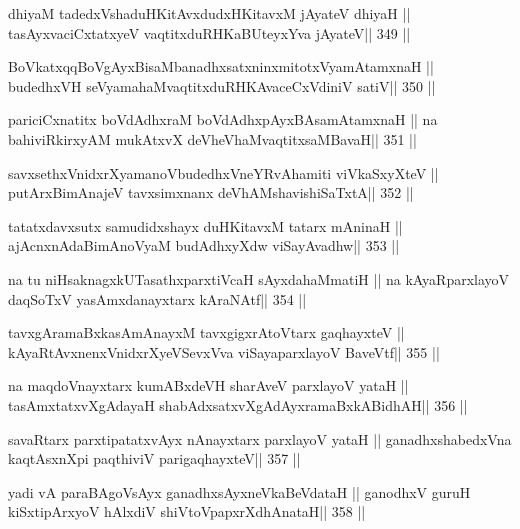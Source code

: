 \begin{shl}
dhiyaM tadedxVshaduHKitAvxdudxHKitavxM jAyateV dhiyaH ||
tasAyxvaciCxtatxyeV vaqtitxduRHKaBUteyxYva jAyateV\hfill || 349 ||
\end{shl}

\begin{shl}
BoVkatxqqBoVgAyxBisaMbanadhxsatxninxmitotxV\s yamAtamxnaH ||
budedhxVH seVyamahaMvaqtitxduRHKAvaceCxVdiniV satiV\hfill || 350 ||
\end{shl}

\begin{shl}
pariciCxnatitx boVdAdhxraM boVdAdhx\s pAyxBAsamAtamxnaH ||
na bahiviRkirxyAM mukAtxvX deVheV\s haMvaqtitxsaMBavaH\hfill || 351 ||
\end{shl}

\begin{shl}
savxsethxVnidxrXyamanoVbudedhxVneYRvAhamiti viVkaSxyXteV ||
putArxBimAnajeV tavxsimxnanx deVhAMshavishiSaTxtA\hfill || 352 ||
\end{shl}

\begin{shl}
tatatxdavxsutx samudidxshayx duHKitavxM tatarx mAninaH ||
ajAcnxnAdaBimAnoV\s yaM budAdhxyXdw viSayAvadhw\hfill || 353 ||
\end{shl}

\begin{shl}
na tu niHsaknagxkUTasathxparxtiVcaH sAyxdahaMmatiH ||
na kAyaRparxlayoV daqSoTxV yasAmxdanayxtarx kAraNAtf\hfill || 354 ||
\end{shl}

\begin{shl}
tavxgAramaBxkasAmAnayxM tavxgigxrA\s toV\s tarx gaqhayxteV ||
kAyaRtAvxnenxVnidxrXyeVSevxVva viSayaparxlayoV BaveVtf\hfill || 355 ||
\end{shl}

\begin{shl}
na maqdoV\s nayxtarx kumABxdeVH sharAveV parxlayoV yataH ||
tasAmxtatxvXgAdayaH shabAdxsatxvXgAdAyxramaBxkABidhAH\hfill || 356 ||
\end{shl}

\begin{shl}
savaRtarx parxtipatatxvAyx nAnayxtarx parxlayoV yataH ||
ganadhxshabedxVna kaqtAsxnX\s pi paqthiviV parigaqhayxteV\hfill || 357 ||
\end{shl}

\begin{shl}
yadi vA paraBAgoV\s sAyx ganadhxsAyxneVkaBeVdataH ||
ganodhxV guruH kiSxtipArxyoV hAlxdiV shiVtoV\s papxrXdhAnataH\hfill || 358 ||
\end{shl}

